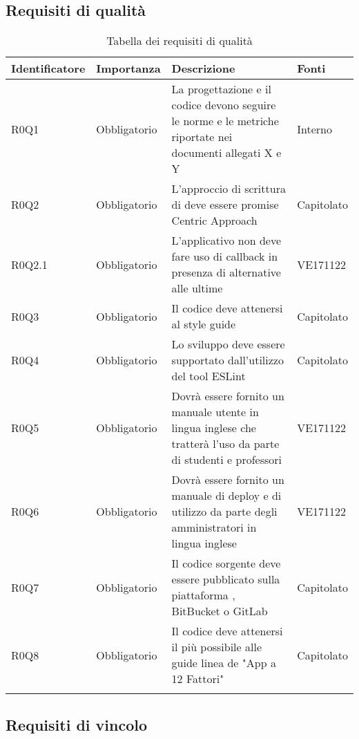 \documentclass[AnalisiDeiRequisiti.tex]{subfiles}
\begin{document}
\subsection{Requisiti di qualità}

\label{table:Tabella requisiti di qualita'} %
\renewcommand*{\arraystretch}{1.2}
\begin{longtable}[H]{p{2.5cm}p{2.5cm}p{5cm}p{2cm}}
	\rowcolor{CHeader} 
	\color{CHeaderText} \textbf{Identificatore} & \color{CHeaderText} \textbf{Importanza} & \color{CHeaderText} \textbf{Descrizione} & \color{CHeaderText} \textbf{Fonti} \\  
	\endhead
	R0Q1 & Obbligatorio & La progettazione e il codice devono seguire le norme e le metriche riportate nei documenti allegati X e Y & Interno \\   %
	R0Q2 & Obbligatorio & L'approccio di scrittura di \citGloss{JavaScript} deve essere promise Centric Approach & Capitolato \\  
	R0Q2.1 & Obbligatorio & L'applicativo non deve fare uso di callback in presenza di alternative alle ultime & VE171122 \\  
	R0Q3 & Obbligatorio & Il codice \citGloss{JavaScript} deve attenersi al \citGloss{airbnb} \citGloss{JavaScript} style guide & Capitolato \\  
	R0Q4 & Obbligatorio & Lo sviluppo deve essere supportato dall'utilizzo del tool ESLint & Capitolato \\  
	R0Q5 & Obbligatorio & Dovrà essere fornito un manuale utente in lingua inglese che tratterà l'uso da parte di studenti e professori & VE171122 \\  
	R0Q6 & Obbligatorio & Dovrà essere fornito un manuale di deploy e di utilizzo da parte degli amministratori in lingua inglese & VE171122 \\   %
	R0Q7 & Obbligatorio & Il codice sorgente deve essere pubblicato sulla piattaforma \citGloss{GitHub}, BitBucket o GitLab & Capitolato \\  
	R0Q8 & Obbligatorio & Il codice deve attenersi il più possibile alle guide linea de "App a 12 Fattori" & Capitolato \\  
	\hiderowcolors
	\caption{Tabella dei requisiti di qualità}
\end{longtable}

\subsection{Requisiti di vincolo}
\end{document}
